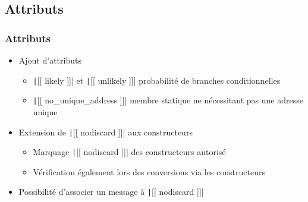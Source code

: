 \documentclass[C++.tex]{subfiles}
\begin{document}
\subsection*{Attributs}
\begin{frame}[fragile]
	\frametitle{Attributs}
	\begin{itemize}
		\item Ajout d'attributs
		\begin{itemize}
			\item \texttt|[[ likely ]]| et \texttt|[[ unlikely ]]| probabilité de branches conditionnelles


			\item \texttt|[[ no_unique_address ]]| membre statique ne nécessitant pas une adresse unique

		\end{itemize}

		\item Extension de \texttt|[[ nodiscard ]]| aux constructeurs
		\begin{itemize}
			\item Marquage \texttt|[[ nodiscard ]]| des constructeurs autorisé


			\item Vérification également lors des conversions via les constructeurs


		\end{itemize}
		\item Possibilité d'associer un message à \texttt|[[ nodiscard ]]|

	\end{itemize}


\end{frame}
\end{document}

